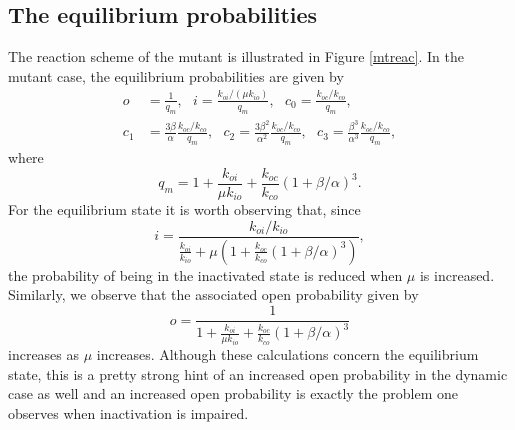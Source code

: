 \subsection{The equilibrium probabilities}
The reaction scheme of the mutant is illustrated in Figure \ref{mtreac}. In
the mutant case, the equilibrium probabilities are given by
\begin{align}
o  &  =\frac{1}{q_{m}},\text{ }i=\frac{k_{oi}/\left(  \mu k_{io}\right)
}{q_{m}},\text{ }c_{0}=\frac{k_{oc}/k_{co}}{q_{m}}, \\
c_{1}  &  =\frac{3\beta}{\alpha}\frac{k_{oc}/k_{co}}{q_{m}},\text{ }
c_{2}=\frac{3\beta^{2}}{\alpha^{2}}\frac{k_{oc}/k_{co}}{q_{m}},\text{ }
c_{3}=\frac{\beta^{3}}{\alpha^{3}}\frac{k_{oc}/k_{co}}{q_{m}}, \nonumber
\end{align}
where
\[
q_{m}=1+\frac{k_{oi}}{\mu k_{io}}+\frac{k_{oc}}{k_{co}}\left(  1+\beta
/\alpha\right)  ^{3}.
\]
For the equilibrium state it is worth observing that, since
\[
i=\frac{k_{oi}/k_{io}}{\frac{k_{oi}}{k_{io}}+\mu\left(  1+\frac{k_{oc}}
{k_{co}}\left(  1+\beta/\alpha\right)  ^{3}\right)  },
\]
the probability of being in the inactivated state is reduced when $\mu$ is
increased. Similarly, we observe that the associated open probability given
by
\[
o=\frac{1}{1+\frac{k_{oi}}{\mu k_{io}}+\frac{k_{oc}}{k_{co}}\left(
1+\beta/\alpha\right)  ^{3}}
\]
increases as $\mu$ increases. Although these calculations concern the 
equilibrium state, this is a pretty strong hint of an increased open 
probability in the dynamic case as well and an increased open probability is 
exactly the problem one observes when inactivation is impaired.

